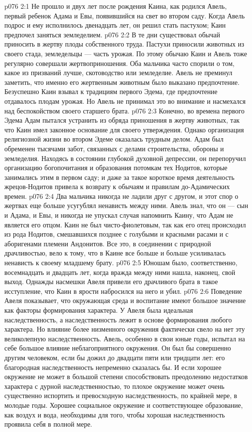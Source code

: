\vs p076 2:1 Не прошло и двух лет после рождения Каина, как родился Авель, первый ребенок Адама и Евы, появившийся на свет во втором саду. Когда Авель подрос и ему исполнилось двенадцать лет, он решил стать пастухом; Каин предпочел заняться земледелием.
\vs p076 2:2 В те дни существовал обычай приносить в жертву плоды собственного труда. Пастухи приносили животных из своего стада, земледельцы --- часть урожая. По этому обычаю Каин и Авель тоже регулярно совершали жертвоприношения. Оба мальчика часто спорили о том, какое из призваний лучше, скотоводство или земледелие. Авель не преминул заметить, что именно его жертвенным животным было выказано предпочтение. Безуспешно Каин взывал к традициям первого Эдема, где предпочтение отдавалось плодам урожая. Но Авель не принимал это во внимание и насмехался над беспокойством своего старшего брата.
\vs p076 2:3 Конечно, во времена первого Эдема Адам пытался устранить из обряда приношения в жертву животных, так что Каин имел законное основание для своего утверждения. Однако организация религиозной жизни во втором Эдеме оказалась трудным делом. Адам был обременен тысячами забот, связанных с делами строительства, обороны и земледелия. Находясь в состоянии глубокой духовной депрессии, он перепоручил организацию богопочитания и образования потомкам тех Нодитов, которые занимались этим в первом саду; и даже за такое короткое время деятельность жрецов\hyp{}Нодитов привела к возврату к обычаям и правилам до\hyp{}Адамических времен.
\vs p076 2:4 Два мальчика никогда не ладили друг с другом, и этот спор о жертвах еще больше усугублял ненависть между ними. Авель знал, что он --- сын и Адама, и Евы, и никогда не упускал случая напомнить Каину, что Адам не является его отцом. Каин не был чисто\hyp{}фиолетовым, так как его отец происходил из рода Нодитов, смешавшихся позднее с голубыми и красными расами и с аборигенами племени Андонитов. Все это, в соединении с природной драчливостью, вело к тому, что в Каине все больше и больше усиливалась ненависть к своему младшему брату.
\vs p076 2:5 Юношам было, соответственно, восемнадцать и двадцать лет, когда вражда между ними нашла, наконец, свой выход. Однажды насмешки Авеля привели его драчливого брата в такое исступление, что Каин в ярости набросился на него и убил.
\vs p076 2:6 \pc Поведение Авеля показывает, что окружающая среда и воспитание имеют большое значение как факторы формирования характера. У Авеля была идеальная наследственность, а наследственность лежит в основе формирования любого характера. Но влияние более низменного окружения фактически свело на нет эту великолепную наследственность. Авель, особенно в свои юные годы, испытал на себе большое влияние неблагоприятного окружения. Он был бы совершенно другим человеком, если бы дожил до двадцати пяти или тридцати лет: его благородная наследственность непременно сказалась бы. И если хорошее окружение не может в большой степени способствовать преодолению недостатков характера с дурной наследственностью, то плохое окружение может очень существенно испортить и превосходную наследственность, по крайней мере, в молодые годы. Хорошее социальное окружение и соответствующее образование, как воздух и вода, необходимы для того, чтобы хорошая наследственность проявила себя в полной мере.
